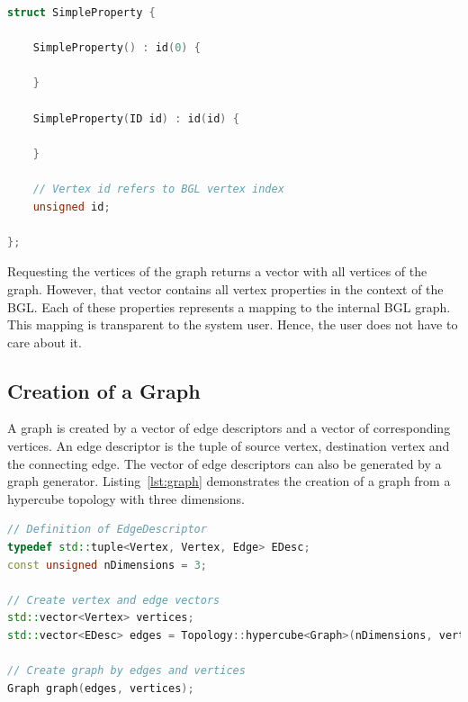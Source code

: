 \begin{minipage}[t]{\textwidth} 
\begin{lstlisting}[language=C++, label=lst:property, caption={Predefined property within the graph class which only provides an id member variable. This property can be used a skeleton for further property implementations. }]
struct SimpleProperty {

    SimpleProperty() : id(0) {

    }
    
    SimpleProperty(ID id) : id(id) {

    }

    // Vertex id refers to BGL vertex index
    unsigned id;
    
};
\end{lstlisting}
\end{minipage}

\noindent Requesting the vertices of the graph returns a vector with
all vertices of the graph. However, that vector contains all vertex
properties in the context of the BGL. Each of these properties
represents a mapping to the internal BGL graph. This mapping is
transparent to the system user. Hence, the user does not have to care
about it.

\subsection{Creation of a Graph}
A graph is created by a vector of edge descriptors and a vector of
corresponding vertices. An edge descriptor is the tuple of source
vertex, destination vertex and the connecting edge. The vector of edge
descriptors can also be generated by a graph
generator. Listing~\ref{lst:graph} demonstrates the creation of a graph from
a hypercube topology with three dimensions.

\begin{minipage}[t]{\textwidth} 
\begin{lstlisting}[language=C++, label=lst:graph, caption={Generation of a three-dimensional hypercube graph. }]
// Definition of EdgeDescriptor
typedef std::tuple<Vertex, Vertex, Edge> EDesc;
const unsigned nDimensions = 3;

// Create vertex and edge vectors
std::vector<Vertex> vertices;
std::vector<EDesc> edges = Topology::hypercube<Graph>(nDimensions, vertices);

// Create graph by edges and vertices
Graph graph(edges, vertices);

\end{lstlisting}
\end{minipage}

